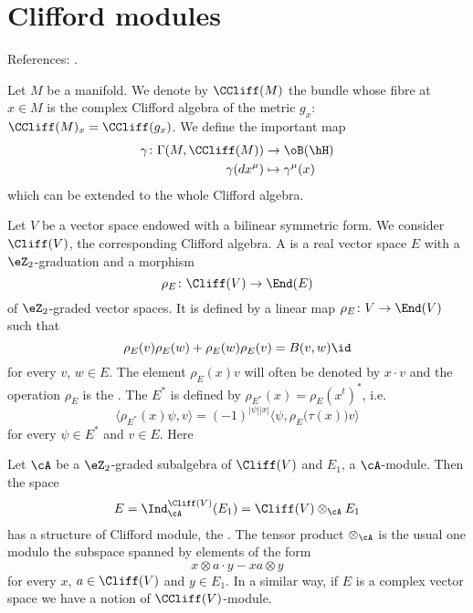 \section{Clifford modules}  \label{susec_Cliffmodule}

References: \cite{ResEtaDiracType,mellor}.

Let $M$ be a manifold. We denote by $\CCliff(M)$ the bundle whose fibre at $x\in M$ is the complex Clifford algebra of the metric $g_x$: $\CCliff(M)_x=\CCliff(g_x)$. We define the important map
\begin{equation}
	\begin{aligned}
		\gamma\colon \Gamma(M,\CCliff(M)) & \to \oB(\hH)            \\
		\gamma(dx^{\mu})                  & \mapsto \gamma^{\mu}(x)
	\end{aligned}
\end{equation}
which can be extended to the whole Clifford algebra.

Let $V$ be a vector space endowed with a bilinear symmetric form. We consider $\Cliff(V)$, the corresponding Clifford algebra. A  is a real vector space $E$ with a $\eZ_2$-graduation and a morphism
\[
	\rho_E\colon \Cliff(V)\to \End(E)
\]
of $\eZ_2$-graded vector spaces. It is defined by a linear map $\rho_E\colon V\to \End(V)$ such that
\begin{equation}
	\rho_E(v)\rho_E(w)+\rho_E(w)\rho_E(v)=B(v,w)\id
\end{equation}
for every $v$, $w\in E$. The element $\rho_E(x)v$ will often be denoted by $x\cdot v$ and the operation $\rho_E$ is the . The  $E^*$ is defined by $\rho_{E^*}(x)=\rho_E(x^t)^*$, i.e.
\begin{equation}
	\langle \rho_{E^*}(x)\psi,v \rangle =(-1)^{| \psi | |x |}\langle \psi, \rho_E\big( \tau(x) \big)v\rangle
\end{equation}
for every $\psi\in E^*$ and $v\in E$. Here

Let $\cA$ be a $\eZ_2$-graded subalgebra of $\Cliff(V)$ and $E_1$, a $\cA$-module. Then the space
\[
	E=\Ind_{\cA}^{\Cliff(V)}(E_1)=\Cliff(V)\otimes_{\cA}E_1
\]
has a structure of Clifford module, the . The tensor product $\otimes_{\cA}$ is the usual one modulo the subspace spanned by elements of the form
\[
	x\otimes a\cdot y-xa\otimes y
\]
for every $x$, $a\in\Cliff(V)$ and $y\in E_1$. In a similar way, if $E$ is a complex vector space we have a notion of $\CCliff(V)$-module.

